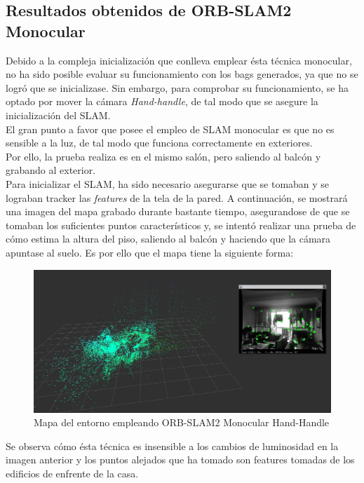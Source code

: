 \subsection{Resultados obtenidos de ORB-SLAM2 Monocular}
Debido a la compleja inicialización que conlleva emplear ésta técnica monocular, no ha sido posible evaluar su funcionamiento con los bags generados, ya que no se logró que se
inicializase. Sin embargo, para comprobar su funcionamiento, se ha optado por mover la cámara \textit{Hand-handle}, de tal modo que se asegure la inicialización del SLAM. \\
El gran punto a favor que posee el empleo de SLAM monocular es que no es sensible a la luz, de tal modo que funciona correctamente en exteriores. \\
Por ello, la prueba realiza es en el mismo salón, pero saliendo al balcón y grabando al exterior. \\

Para inicializar el SLAM, ha sido necesario asegurarse que se tomaban y se lograban tracker las \textit{features} de la tela de la pared. A continuación, se mostrará una imagen
del mapa grabado durante bastante tiempo, asegurandose de que se tomaban los suficientes puntos característicos y, se intentó realizar una prueba de cómo estima la altura del piso, 
saliendo al balcón y haciendo que la cámara apuntase al suelo. Es por ello que el mapa tiene la siguiente forma:

\begin{figure}[h!]
    \centering
    \includegraphics[width=.9\textwidth]{images/slam/mono}
    \caption{Mapa del entorno empleando ORB-SLAM2 Monocular Hand-Handle}
\end{figure}

Se observa cómo ésta técnica es insensible a los cambios de luminosidad en la imagen anterior y los puntos alejados que ha tomado son features tomadas de los edificios de enfrente de la
casa.